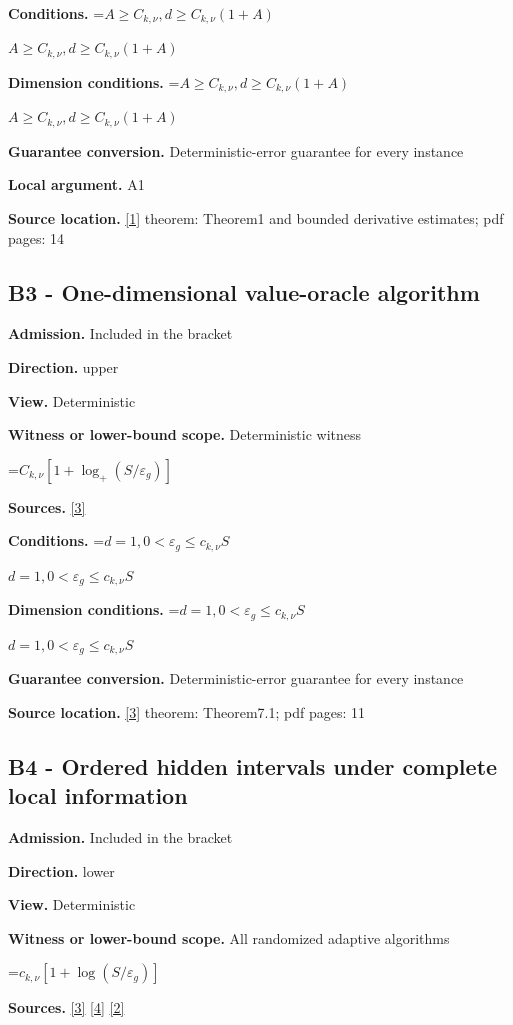 \documentclass[10pt,a4paper]{article}
\newcommand{\AtlasMath}[1]{\par\begingroup\centering\setbox0=\hbox{$\displaystyle #1$}\ifdim\wd0>1.4\linewidth\typeout{ATLAS WIDE FORMULA: \the\wd0}\fi\ifdim\wd0>\linewidth\resizebox{\linewidth}{!}{\box0}\else\box0\fi\par\endgroup}
\newcommand{\AtlasInlineMath}[1]{\begingroup\setbox0=\hbox{$#1$}\ifdim\wd0>.4\linewidth\endgroup\AtlasMath{#1}\else\endgroup$#1$\fi}
\begin{document}
\textbf{Conditions.} \AtlasInlineMath{A\ge C_{k,\nu},d\ge C_{k,\nu}(1+A)}

\textbf{Dimension conditions.} \AtlasInlineMath{A\ge C_{k,\nu},d\ge C_{k,\nu}(1+A)}

\textbf{Guarantee conversion.} Deterministic-error guarantee for every instance

\textbf{Local argument.} A1

\textbf{Source location.} \href{https://arxiv.org/abs/1710.11606}{[1]} theorem: Theorem1 and bounded derivative estimates; pdf pages: 14

\subsection{B3 - One-dimensional value-oracle algorithm}
\textbf{Admission.} Included in the bracket

\textbf{Direction.} upper

\textbf{View.} Deterministic

\textbf{Witness or lower-bound scope.} Deterministic witness

\AtlasMath{C_{k,\nu}[1+\log_+(S/\varepsilon_g)]}
\textbf{Sources.} \href{https://arxiv.org/abs/2610.16295}{[3]}

\textbf{Conditions.} \AtlasInlineMath{d=1,0<\varepsilon_g\le c_{k,\nu}S}

\textbf{Dimension conditions.} \AtlasInlineMath{d=1,0<\varepsilon_g\le c_{k,\nu}S}

\textbf{Guarantee conversion.} Deterministic-error guarantee for every instance

\textbf{Source location.} \href{https://arxiv.org/abs/2610.16295}{[3]} theorem: Theorem7.1; pdf pages: 11

\subsection{B4 - Ordered hidden intervals under complete local information}
\textbf{Admission.} Included in the bracket

\textbf{Direction.} lower

\textbf{View.} Deterministic

\textbf{Witness or lower-bound scope.} All randomized adaptive algorithms

\AtlasMath{c_{k,\nu}[1+\log(S/\varepsilon_g)]}
\textbf{Sources.} \href{https://arxiv.org/abs/2610.16295}{[3]} \href{https://arxiv.org/abs/1710.11606v3}{[4]} \href{https://arxiv.org/abs/1811.01220}{[2]}
\end{document}
